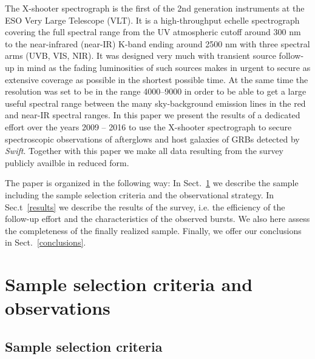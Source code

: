 \documentclass{aa}    %
\begin{document}
The X-shooter spectrograph \citep{Vernet2011} is the first of the 2nd
generation instruments at the ESO Very Large Telescope (VLT). It is a
high-throughput echelle spectrograph covering the full spectral range from the
UV atmospheric cutoff around 300 nm to the near-infrared (near-IR) K-band 
ending around 2500 nm with three spectral
arms (UVB, VIS, NIR). It was designed very much with transient source follow-up
in mind as the fading luminosities of such sources makes in urgent to secure as
extensive coverage as possible in the shortest possible time. At the same time
the resolution was set to be in the range 4000--9000 in order to be able to get
a large useful spectral range between the many sky-background emission lines in
the red and near-IR spectral ranges. In this paper we present the results
of a dedicated effort over the years 2009 -- 2016 to use the X-shooter
spectrograph to secure spectroscopic observations of
afterglows and host galaxies of GRBs detected by {\it Swift}. 
Together with this paper we make all data resulting from the survey publicly 
availble in reduced form.

The paper is organized in the following way: In Sect.~\ref{sample} we describe
the sample including the sample selection criteria and the observational
strategy.  In Sec.t~\ref{results} we describe the results of the survey, i.e.
the efficiency of the follow-up effort and the characteristics of the observed
bursts. We also here assess the completeness of the finally realized sample.
Finally, we offer our conclusions in Sect.~\ref{conclusions}.


\section{Sample selection criteria and observations}\label{sample}



\subsection{Sample selection criteria} \label{samplecrit}
\end{document}
